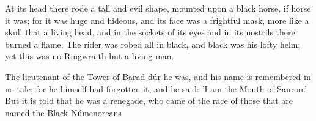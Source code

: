 At its head there rode a tall and evil shape, mounted upon a black horse, if horse it was; for it was huge and hideous, and its face was a frightful mask, more like a skull that a living head, and in the sockets of its eyes and in its nostrils there burned a flame. The rider was robed all in black, and black was his lofty helm; yet this was no Ringwraith but a living man.

The lieutenant of the Tower of Barad-dúr he was, and his name is remembered in no tale; for he himself had forgotten it, and he said: 'I am the Mouth of Sauron.' But it is told that he was a renegade, who came of the race of those that are named the Black Númenoreans